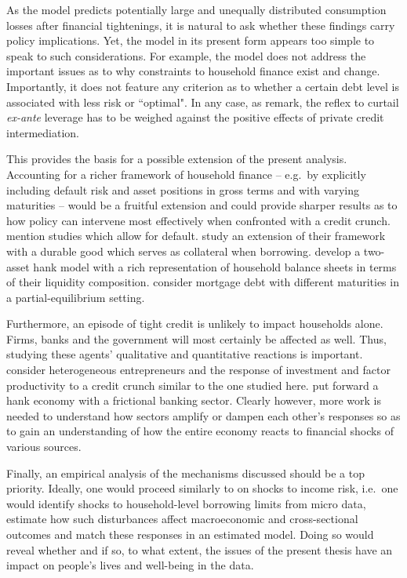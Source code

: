 \documentclass[a4paper,12pt]{article} %
\numberwithin{equation}{section} %
\numberwithin{figure}{section}
\numberwithin{table}{section}
\begin{document}
As the model predicts potentially large and unequally distributed consumption losses after financial tightenings, it is natural to ask whether these findings carry policy implications. Yet, the model in its present form appears too simple to speak to such considerations. For example, the model does not address the important issues as to why constraints to household finance exist and change. Importantly, it does not feature any criterion as to whether a certain debt level is associated with less risk or ``optimal". In any case, as \textcite{korinek2016} remark, the reflex to curtail \textit{ex-ante} leverage has to be weighed against the positive effects of private credit intermediation. 

This provides the basis for a possible extension of the present analysis. Accounting for a richer framework of household finance -- e.g.~by explicitly including default risk and asset positions in gross terms and with varying maturities -- would be a fruitful extension and could provide sharper results as to how policy can intervene most effectively when confronted with a credit crunch. \textcite{heath2009} mention studies which allow for default. \textcite{gl2017} study an extension of their framework with a durable good which serves as collateral when borrowing. \textcite{kaplan2018} develop a two-asset \Gls{hank} model with a rich representation of household balance sheets in terms of their liquidity composition. \textcite{guerrieri2020} consider mortgage debt with different maturities in a partial-equilibrium setting.

Furthermore, an episode of tight credit is unlikely to impact households alone. Firms, banks and the government will most certainly be affected as well. Thus, studying these agents' qualitative and quantitative reactions is important. \textcite{buera2020} consider heterogeneous entrepreneurs and the response of investment and factor productivity to a credit crunch similar to the one studied here. \textcite{lee2021} put forward a \Gls{hank} economy with a frictional banking sector. Clearly however, more work is needed to understand how sectors amplify or dampen each other's responses so as to gain an understanding of how the entire economy reacts to financial shocks of various sources.

Finally, an empirical analysis of the mechanisms discussed should be a top priority. Ideally, one would proceed similarly to \textcite{bayer2019} on shocks to income risk, i.e.~one would identify shocks to household-level borrowing limits from micro data, estimate how such disturbances affect macroeconomic and cross-sectional outcomes and match these responses in an estimated model. Doing so would reveal whether and if so, to what extent, the issues of the present thesis have an impact on people's lives and well-being in the data.
\end{document}
